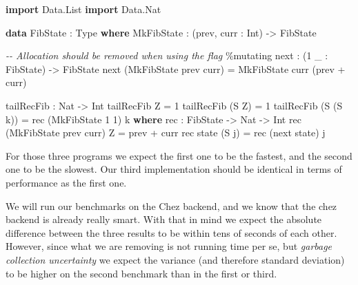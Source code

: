 \documentclass[
]{article}
\newenvironment{Shaded}{}{}
\newcommand{\CommentTok}[1]{\textcolor[rgb]{0.38,0.63,0.69}{\textit{#1}}}
\newcommand{\DataTypeTok}[1]{\textcolor[rgb]{0.56,0.13,0.00}{#1}}
\newcommand{\DecValTok}[1]{\textcolor[rgb]{0.25,0.63,0.44}{#1}}
\newcommand{\KeywordTok}[1]{\textcolor[rgb]{0.00,0.44,0.13}{\textbf{#1}}}
\newcommand{\NormalTok}[1]{#1}
\newcommand{\OperatorTok}[1]{\textcolor[rgb]{0.40,0.40,0.40}{#1}}
\newcommand{\OtherTok}[1]{\textcolor[rgb]{0.00,0.44,0.13}{#1}}
\begin{document}
\begin{Shaded}
\begin{Highlighting}[]
\KeywordTok{import} \DataTypeTok{Data.List}
\KeywordTok{import} \DataTypeTok{Data.Nat}

\KeywordTok{data} \DataTypeTok{FibState} \OperatorTok{:} \DataTypeTok{Type} \KeywordTok{where}
  \DataTypeTok{MkFibState} \OperatorTok{:}\NormalTok{ (prev, curr }\OperatorTok{:}  \DataTypeTok{Int}\NormalTok{) }\OtherTok{{-}\textgreater{}} \DataTypeTok{FibState}

\CommentTok{{-}{-} Allocation should be removed when using the flag}
\OperatorTok{\%}\NormalTok{mutating}
\NormalTok{next }\OperatorTok{:}\NormalTok{ (}\DecValTok{1}\NormalTok{ \_ }\OperatorTok{:} \DataTypeTok{FibState}\NormalTok{) }\OtherTok{{-}\textgreater{}} \DataTypeTok{FibState}
\NormalTok{next (}\DataTypeTok{MkFibState}\NormalTok{ prev curr) }\OtherTok{=} \DataTypeTok{MkFibState}\NormalTok{ curr (prev }\OperatorTok{+}\NormalTok{ curr)}

\NormalTok{tailRecFib }\OperatorTok{:} \DataTypeTok{Nat} \OtherTok{{-}\textgreater{}} \DataTypeTok{Int}
\NormalTok{tailRecFib }\DataTypeTok{Z} \OtherTok{=} \DecValTok{1}
\NormalTok{tailRecFib (}\DataTypeTok{S} \DataTypeTok{Z}\NormalTok{) }\OtherTok{=} \DecValTok{1}
\NormalTok{tailRecFib (}\DataTypeTok{S}\NormalTok{ (}\DataTypeTok{S}\NormalTok{ k)) }\OtherTok{=}\NormalTok{ rec (}\DataTypeTok{MkFibState} \DecValTok{1} \DecValTok{1}\NormalTok{) k}
  \KeywordTok{where}
\NormalTok{    rec }\OperatorTok{:} \DataTypeTok{FibState} \OtherTok{{-}\textgreater{}} \DataTypeTok{Nat} \OtherTok{{-}\textgreater{}} \DataTypeTok{Int}
\NormalTok{    rec (}\DataTypeTok{MkFibState}\NormalTok{ prev curr) }\DataTypeTok{Z} \OtherTok{=}\NormalTok{ prev }\OperatorTok{+}\NormalTok{ curr}
\NormalTok{    rec state (}\DataTypeTok{S}\NormalTok{ j) }\OtherTok{=}\NormalTok{ rec (next state) j}
\end{Highlighting}
\end{Shaded}

For those three programs we expect the first one to be the fastest, and
the second one to be the slowest. Our third implementation should be
identical in terms of performance as the first one.

We will run our benchmarks on the Chez backend, and we know that the
chez backend is already really smart. With that in mind we expect the
absolute difference between the three results to be within tens of
seconds of each other. However, since what we are removing is not
running time per se, but \emph{garbage collection uncertainty} we expect
the variance (and therefore standard deviation) to be higher on the
second benchmark than in the first or third.
\end{document}
